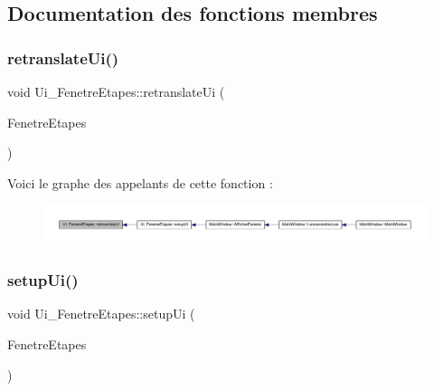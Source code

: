 \subsection{Documentation des fonctions membres}
\mbox{\label{class_ui___fenetre_etapes_a12b8a73438c7adfe883f9deb6af95426}} 
\subsubsection{\texorpdfstring{retranslate\+Ui()}{retranslateUi()}}
{\footnotesize\ttfamily void Ui\+\_\+\+Fenetre\+Etapes\+::retranslate\+Ui (\begin{DoxyParamCaption}\item[{Q\+Widget $\ast$}]{Fenetre\+Etapes }\end{DoxyParamCaption})\hspace{0.3cm}{\ttfamily [inline]}}

Voici le graphe des appelants de cette fonction \+:
\nopagebreak
\begin{figure}[H]
\begin{center}
\leavevmode
\includegraphics[width=350pt]{class_ui___fenetre_etapes_a12b8a73438c7adfe883f9deb6af95426_icgraph}
\end{center}
\end{figure}
\mbox{\label{class_ui___fenetre_etapes_a5bf35503b72beb223e5a03ea046524a1}} 
\subsubsection{\texorpdfstring{setup\+Ui()}{setupUi()}}
{\footnotesize\ttfamily void Ui\+\_\+\+Fenetre\+Etapes\+::setup\+Ui (\begin{DoxyParamCaption}\item[{Q\+Widget $\ast$}]{Fenetre\+Etapes }\end{DoxyParamCaption})\hspace{0.3cm}{\ttfamily [inline]}}

